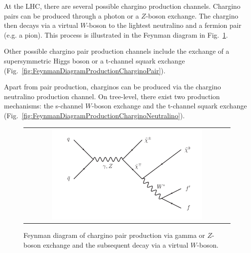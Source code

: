 
At the LHC, there are several possible chargino production channels. 
Chargino pairs can be produced through a photon or a $Z$-boson exchange. 
The chargino then decays via a virtual $W$-boson to the lightest neutralino and a fermion pair (e.g. a pion). 
This process is illustrated in the Feynman diagram in Fig.~\ref{fig:FeynmanDiagram}.


Other possible chargino pair production channels include the exchange of a supersymmetric Higgs boson or a t-channel squark exchange (Fig.~\ref{fig:FeynmanDiagramProductionCharginoPair}).


Apart from pair production, charginos can be produced via the chargino neutralino production channel. 
On tree-level, there exist two production mechanisms: the s-channel $W$-boson exchange and the t-channel squark exchange (Fig.~\ref{fig:FeynmanDiagramProductionCharginoNeutralino}).
\begin{figure}[!h]
  \centering 
  \begin{tabular}{c}
    \includegraphics[width=0.75\textwidth]{figures/analysis/ChiChi_ProductionAndDecay.pdf}
  \end{tabular}
  \caption{Feynman diagram of chargino pair production via gamma or $Z$-boson exchange and the subsequent decay via a virtual $W$-boson.}
  \vspace{20pt}
  \label{fig:FeynmanDiagram}
\end{figure}

